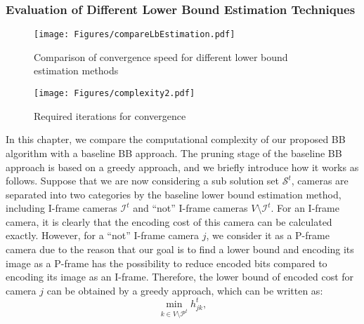 \subsubsection{Evaluation of Different Lower Bound Estimation Techniques}
\begin{figure}
\begin{center}
\texttt{[image: Figures/compareLbEstimation.pdf]}
\caption{\label{fig::compareLbEstimation} Comparison of convergence speed for different lower bound estimation methods}
\end{center}
\end{figure}
%
%
\begin{figure}
\begin{center}
\texttt{[image: Figures/complexity2.pdf]}
\caption{\label{fig::complexity} Required iterations for convergence}
\end{center}
\end{figure}
%
In this chapter, we compare the computational complexity of our proposed BB algorithm with a baseline BB approach.
The pruning stage of the baseline BB approach is based on a greedy approach, and we briefly introduce how it works as follows.
Suppose that we are now considering a sub solution set $\mathcal{S}^t$, cameras are separated into two categories by the baseline lower bound estimation method, including I-frame cameras $\mathcal{I}^t$ and ``not'' I-frame cameras $V \setminus \mathcal{I}^t$.
For an I-frame camera, it is clearly that the encoding cost of this camera can be calculated exactly.
However, for a ``not'' I-frame camera $j$, we consider it as a P-frame camera due to the reason that our goal is to find a lower bound and encoding its image as a P-frame has the possibility to reduce encoded bits compared to encoding its image as an I-frame.
Therefore, the lower bound of encoded cost for camera $j$ can be obtained by a greedy approach, which can be written as:
\begin{equation}
\underset{k \in V \setminus \mathcal{P}^t}{\min} h_{jk}^t,
\label{eq::lbGreedy}
\end{equation}
